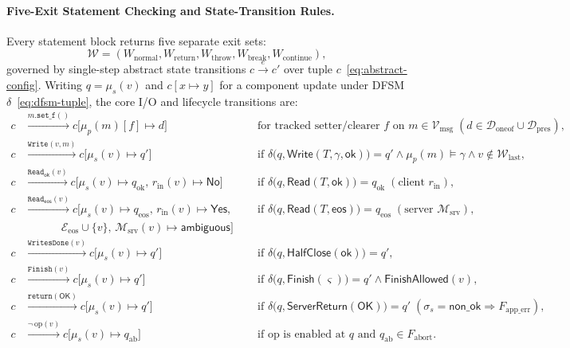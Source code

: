 \paragraph{Five-Exit Statement Checking and State-Transition Rules.}
Every statement block returns five separate exit sets:
\begin{equation}
\label{eq:walk-result}
\mathcal{W} = (W_{\mathrm{normal}}, W_{\mathrm{return}}, W_{\mathrm{throw}}, W_{\mathrm{break}}, W_{\mathrm{continue}}),
\end{equation}
governed by single-step abstract state transitions $c \xrightarrow{e} c'$ over tuple $c$~\eqref{eq:abstract-config}. Writing $q = \mu_s(v)$ and $c[x \!\mapsto\! y]$ for a component update under DFSM $\delta$~\eqref{eq:dfsm-tuple}, the core I/O and lifecycle transitions are:
{\small
\begin{equation}
\label{eq:state-transitions}
\begin{alignedat}{2}
c &\xrightarrow{m.\mathtt{set\_f}()} c\bigl[\mu_p(m)[f]\!\mapsto\! d\bigr]
    &\;\;&\text{for tracked setter/clearer } f \text{ on } m\!\in\!\mathcal{V}_{\mathrm{msg}}\; (d\!\in\!\mathcal{D}_{\mathrm{oneof}}\!\cup\!\mathcal{D}_{\mathrm{pres}}), \\
c &\xrightarrow{\mathtt{Write}(v,m)} c\bigl[\mu_s(v)\!\mapsto\! q'\bigr]
    &\;\;&\text{if }\delta\bigl(q,\mathsf{Write}(T,\gamma,\mathsf{ok})\bigr)=q' \land \mu_p(m)\models\gamma \land v\notin\mathcal{W}_{\mathrm{last}}, \\
c &\xrightarrow{\mathtt{Read}_{\mathsf{ok}}(v)} c\bigl[\mu_s(v)\!\mapsto\! q_{\mathrm{ok}},\, r_{\mathrm{in}}(v)\!\mapsto\!\mathsf{No}\bigr]
    &\;\;&\text{if }\delta\bigl(q,\mathsf{Read}(T,\mathsf{ok})\bigr)=q_{\mathrm{ok}}\; (\text{client } r_{\mathrm{in}}), \\
c &\xrightarrow{\mathtt{Read}_{\mathsf{eos}}(v)} c\bigl[\mu_s(v)\!\mapsto\! q_{\mathrm{eos}},\, r_{\mathrm{in}}(v)\!\mapsto\!\mathsf{Yes},
    &\;\;&\text{if }\delta\bigl(q,\mathsf{Read}(T,\mathsf{eos})\bigr)=q_{\mathrm{eos}}\; (\text{server }\mathcal{M}_{\mathrm{srv}}), \\[-2pt]
  &\qquad\quad\; \mathcal{E}_{\mathrm{eos}}\!\cup\!\{v\},\, \mathcal{M}_{\mathrm{srv}}(v)\!\mapsto\!\mathsf{ambiguous}\bigr] & & \\
c &\xrightarrow{\mathtt{WritesDone}(v)} c\bigl[\mu_s(v)\!\mapsto\! q'\bigr]
    &\;\;&\text{if }\delta\bigl(q,\mathsf{HalfClose}(\mathsf{ok})\bigr)=q', \\
c &\xrightarrow{\mathtt{Finish}(v)} c\bigl[\mu_s(v)\!\mapsto\! q'\bigr]
    &\;\;&\text{if }\delta\bigl(q,\mathsf{Finish}(\varsigma)\bigr)=q' \land \mathsf{FinishAllowed}(v), \\
c &\xrightarrow{\mathtt{return}(\mathsf{OK})} c\bigl[\mu_s(v)\!\mapsto\! q'\bigr]
    &\;\;&\text{if }\delta\bigl(q,\mathsf{ServerReturn}(\mathsf{OK})\bigr)=q'\; (\sigma_s\!=\!\mathsf{non\_ok}\!\Rightarrow\! F_{\mathrm{app\_err}}), \\
c &\xrightarrow{\neg\,\mathrm{op}(v)} c\bigl[\mu_s(v)\!\mapsto\! q_{\mathrm{ab}}\bigr]
    &\;\;&\text{if }\mathrm{op}\text{ is enabled at } q \text{ and } q_{\mathrm{ab}}\in F_{\mathrm{abort}}.
\end{alignedat}
\end{equation}
}
